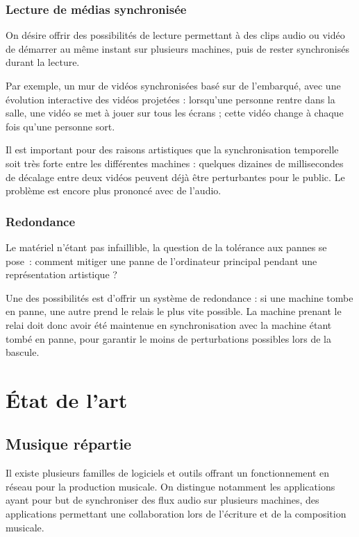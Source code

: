 \documentclass[10pt]{article}
\newcommand\trigger{point d'interaction\xspace}
\begin{document}

\subsubsection{Lecture de médias synchronisée}
On désire offrir des possibilités de lecture permettant à 
des clips audio ou vidéo de démarrer au même instant sur plusieurs machines, 
puis de rester synchronisés durant la lecture.

Par exemple, un mur de vidéos synchronisées basé sur de l'embarqué, avec 
une évolution interactive des vidéos projetées : lorsqu'une personne rentre dans la salle, une vidéo se met à jouer sur tous les écrans ; cette vidéo change à chaque fois qu'une personne sort.

Il est important pour des raisons artistiques que la synchronisation temporelle soit très forte entre les différentes machines : quelques dizaines de millisecondes de décalage entre deux vidéos peuvent déjà être perturbantes pour le public. 
Le problème est encore plus prononcé avec de l'audio.

\subsubsection{Redondance}
Le matériel n'étant pas infaillible, la question de la tolérance aux pannes se pose~: comment mitiger une panne de l'ordinateur principal pendant une représentation artistique ?

Une des possibilités est d'offrir un système de redondance : si une machine tombe en panne, une autre prend le relais le plus vite possible.
La machine prenant le relai doit donc avoir été maintenue en synchronisation avec la machine étant tombé en panne, pour garantir le moins de perturbations possibles lors de la bascule.
 

\section{État de l'art}
\subsection{Musique répartie}
Il existe plusieurs familles de logiciels et outils offrant un fonctionnement en réseau pour la production musicale.
On distingue notamment les applications ayant pour but de synchroniser des 
flux audio sur plusieurs machines, des applications permettant une collaboration lors 
de l'écriture et de la composition musicale.
\end{document}
